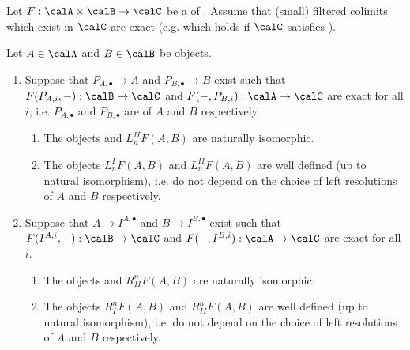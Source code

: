 \begin{theorem} \label{theorem:balancing_generalized_derived_functors_of_a_biadditive_functor_of_abelian_categories_computed_via_flat_resolutions}
    Let $F: \calA \times \calB \to \calC$ be a  of . Assume that (small) filtered colimits which exist in $\calC$ are exact (e.g. which holds if $\calC$ satisfies ).

    Let $A \in \calA$ and $B \in \calB$ be objects. 
    \begin{enumerate}
        \item Suppose that  $P_{A,\bullet} \to A$ and $P_{B,\bullet} \to B$ exist such that $F(P_{A,i}, -): \calB \to \calC$ and $F(-, P_{B,i}): \calA \to \calC$ are exact for all $i$, i.e. $P_{A,\bullet}$ and $P_{B,\bullet}$ are  of $A$ and $B$ respectively. 
        \begin{enumerate}
            \item The objects  and $L_n^{II}F(A,B)$ are naturally isomorphic.
            \item The objects $L_n^{I}F(A,B)$ and $L_n^{II}F(A,B)$ are well defined (up to natural isomorphism), i.e. do not depend on the choice of left resolutions of $A$ and $B$ respectively.
        \end{enumerate}

        \item Suppose that  $A \to I^{A,\bullet}$ and $B \to I^{B,\bullet}$ exist such that $F(I^{A,i}, -): \calB \to \calC$ and $F(-, I^{B,i}): \calA \to \calC$ are exact for all $i$. 
        \begin{enumerate}
            \item The objects  and $R^n_{II}F(A,B)$ are naturally isomorphic.
            \item The objects $R^n_{I}F(A,B)$ and $R^n_{II}F(A,B)$ are well defined (up to natural isomorphism), i.e. do not depend on the choice of left resolutions of $A$ and $B$ respectively.
        \end{enumerate}
    \end{enumerate}
\end{theorem}

